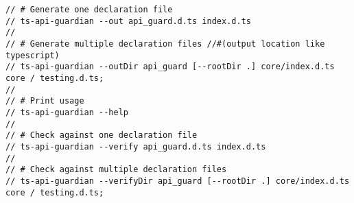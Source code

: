 \begin{verbatim}
// # Generate one declaration file
// ts-api-guardian --out api_guard.d.ts index.d.ts
//
// # Generate multiple declaration files //#(output location like typescript)
// ts-api-guardian --outDir api_guard [--rootDir .] core/index.d.ts
core / testing.d.ts;
//
// # Print usage
// ts-api-guardian --help
//
// # Check against one declaration file
// ts-api-guardian --verify api_guard.d.ts index.d.ts
//
// # Check against multiple declaration files
// ts-api-guardian --verifyDir api_guard [--rootDir .] core/index.d.ts
core / testing.d.ts;
\end{verbatim}
